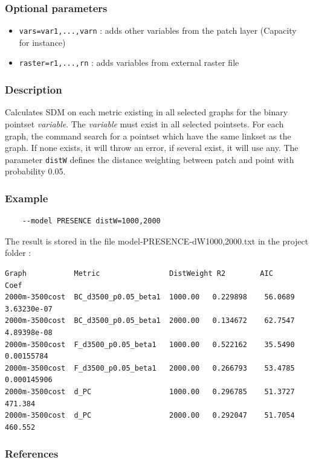 \documentclass[a4paper,10pt]{report}
\begin{document}
\subsubsection{Optional parameters}
\begin{itemize}
	\item \verb|vars=var1,...,varn| : adds other variables from the patch layer  (Capacity for instance)
	\item \verb|raster=r1,...,rn| : adds variables from external raster file
\end{itemize}

\subsubsection{Description}
Calculates SDM on each metric existing in all selected graphs for the binary pointset \textit{variable}.
The \textit{variable} must exist in all selected pointsets.
For each graph, the command search for a pointset which have the same linkset as the graph. If none exists, it will throw an error, if several exist, it will use any.
The parameter \verb|distW| defines the distance weighting between patch and point with probability 0.05.

\subsubsection{Example}
\begin{Verbatim}
	--model PRESENCE distW=1000,2000
\end{Verbatim}
The result is stored in the file model-PRESENCE-dW1000,2000.txt in the project folder :
\begin{Verbatim}[tabsize=3]
Graph           Metric                DistWeight R2        AIC       Coef
2000m-3500cost  BC_d3500_p0.05_beta1  1000.00	0.229898	56.0689	3.63230e-07
2000m-3500cost  BC_d3500_p0.05_beta1  2000.00	0.134672	62.7547	4.89398e-08
2000m-3500cost  F_d3500_p0.05_beta1   1000.00	0.522162	35.5490	0.00155784
2000m-3500cost  F_d3500_p0.05_beta1   2000.00	0.266793	53.4785	0.000145906
2000m-3500cost  d_PC                  1000.00	0.296785	51.3727	471.384
2000m-3500cost  d_PC                  2000.00	0.292047	51.7054	460.552
\end{Verbatim}

\subsubsection{References}
\cite{2012_SDM, 2012_graphab_EMS, 2013_SDM, 2013_SDM_rainette}
\end{document}
